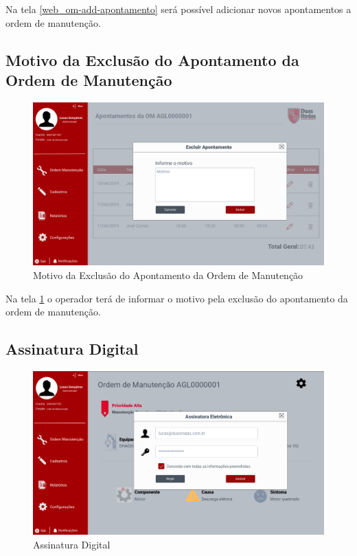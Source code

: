 Na tela \ref{web_om-add-apontamento} será possível adicionar novos apontamentos a ordem de manutenção.

\newpage
\subsection{Motivo da Exclusão do Apontamento da Ordem de Manutenção}

\begin{figure}[htb]
	\caption{\label{web_om-excluir-apontamento-motivo}Motivo da Exclusão do Apontamento da Ordem de Manutenção}
	\begin{center}
		\includegraphics[scale=0.40]{./Figuras/web/om-excluir-apontamento-motivo.png}
	\end{center}
\end{figure}

Na tela \ref{web_om-excluir-apontamento-motivo} o operador terá de informar o motivo pela exclusão do apontamento da ordem de manutenção.

\newpage
\subsection{Assinatura Digital}

\begin{figure}[htb]
	\caption{\label{web_om-assinatura}Assinatura Digital}
	\begin{center}
		\includegraphics[scale=0.40]{./Figuras/web/om-assinatura.png}
	\end{center}
\end{figure}

